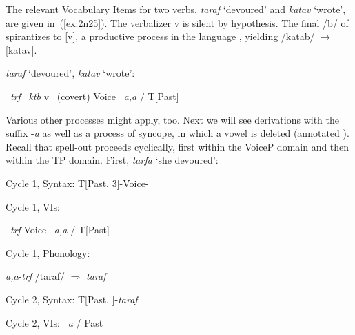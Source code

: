 \begin{exe}
\begin{xlist}
\begin{exe}
\begin{xlist}
\begin{exe}
\begin{xlist}
\begin{exe}
\begin{exe}
\begin{xlist}
\begin{exe}
\begin{xlist}
\begin{exe}
\begin{xlist}
\begin{exe}
\begin{xlist}
\begin{exe}
\begin{xlist}
\begin{exe}
\begin{xlist}
\begin{exe}
\begin{xlist}
\begin{exe}
\begin{xlist}
\begin{exe}
\begin{xlist}
\begin{exe}
\begin{xlist}
\begin{exe}
\begin{xlist}
\begin{exe}
\begin{xlist}
\begin{exe}
\begin{exe}
\begin{xlist}
\begin{exe}
\begin{xlist}
\begin{exe}
\begin{xlist}
\begin{exe}
\begin{xlist}
{\begin{exe}
\begin{xlist}
\begin{exe}
\begin{xlist}
 \z
\z 

The relevant Vocabulary Items for two verbs, \emph{taraf} `devoured' and \emph{katav} `wrote', are given in~(\ref{ex:2n25}). The verbalizer v is silent by hypothesis. The final /b/ of  spirantizes to [v], a productive process in the language \citep{temkinmartinzemuellner16,kastner17gjgl,kastner18nllt}, yielding /katab/ $\rightarrow$ [katav].
 \begin{exe}
 \ex  \label{ex:2n25}\emph{taraf} `devoured', \emph{katav} `wrote': 
 \begin{xlist} 
 	\ex   {} \lra~\emph{trf} 
 	\ex   {} \lra~\emph{ktb} 
 	\ex   v \lra~(covert) 
 	\ex   Voice \lra~\emph{a,a} / T[Past] \trace 
 \z
\z 

Various other processes might apply, too. Next we will see derivations with the  suffix -\emph{a} as well as a process of syncope, in which a vowel is deleted (annotated ). Recall that spell-out proceeds cyclically, first within the VoiceP domain and then within the TP domain. First, \emph{tarfa} `she devoured':
 \begin{exe}
\ex   Cycle 1, Syntax: 
	 T[Past, 3]-Voice-

 \ex  Cycle 1, VIs: 
 \begin{xlist} 
 	\ex   {} \lra~\emph{trf} 
 	\ex   Voice \lra~\emph{a,a} / T[Past] \trace 
 \z

 \ex  Cycle 1, Phonology: 
 \begin{xlist} 
 	\ex   \emph{a,a}-\emph{trf} 
 	\ex   /taraf/ $\Rightarrow$ \emph{taraf} 
 \z

\ex  Cycle 2, Syntax: 
	T[Past, ]-\emph{taraf}

\ex   Cycle 2, VIs: 
	 \lra~\emph{a} / Past \trace


\end{xlist}
\end{xlist}
\end{exe}
\end{xlist}
\end{exe}
\end{xlist}
\end{exe}
\end{xlist}
\end{exe}}
\end{xlist}
\end{exe}
\end{xlist}
\end{exe}
\end{xlist}
\end{exe}
\end{xlist}
\end{exe}
\end{exe}
\end{xlist}
\end{exe}
\end{xlist}
\end{exe}
\end{xlist}
\end{exe}
\end{xlist}
\end{exe}
\end{xlist}
\end{exe}
\end{xlist}
\end{exe}
\end{xlist}
\end{exe}
\end{xlist}
\end{exe}
\end{xlist}
\end{exe}
\end{xlist}
\end{exe}
\end{xlist}
\end{exe}
\end{xlist}
\end{exe}
\end{exe}
\end{xlist}
\end{exe}
\end{xlist}
\end{exe}
\end{xlist}
\end{exe}
